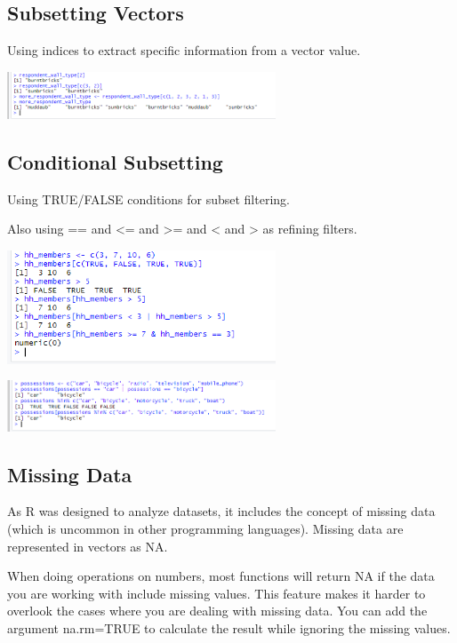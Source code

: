 \documentclass{article}
\begin{document}
\subsection{Subsetting Vectors}

Using indices to extract specific information from a vector value.

\includegraphics[width=8cm]{Images/RStudio012.PNG}

\subsection{Conditional Subsetting}

Using TRUE/FALSE conditions for subset filtering.

Also using == and <= and >= and < and > as refining filters.

\includegraphics[width=8cm]{Images/RStudio013.PNG}

\includegraphics[width=8cm]{Images/RStudio014.PNG}


\subsection{Missing Data}

As R was designed to analyze datasets, it includes the concept of missing data (which is uncommon in other programming languages). Missing data are represented in vectors as NA.

When doing operations on numbers, most functions will return NA if the data you are working with include missing values. This feature makes it harder to overlook the cases where you are dealing with missing data. You can add the argument na.rm=TRUE to calculate the result while ignoring the missing values.
\end{document}
